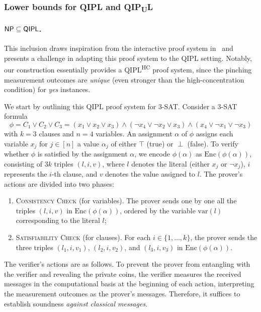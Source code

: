 \documentclass[10pt,a4paper]{article}
\numberwithin{equation}{section}
\numberwithin{figure}{section}
\newcommand{\NP}{\textnormal{\textsf{NP}}\xspace}
\newcommand{\QIPL}{\textnormal{\textsf{QIPL}}\xspace}
\newcommand{\QIPUL}{\texorpdfstring{\textnormal{\textsf{QIP}\textsubscript{\textnormal{U}}\textsf{L}}}\xspace}
\newcommand{\QIPLHC}{\texorpdfstring{\textnormal{\textsf{QIPL}\textsuperscript{\textnormal{HC}}}}\xspace}
\newcommand{\threeSAT}{\textnormal{\textsc{3-SAT}}\xspace}
\newcommand{\var}{\mathrm{var}}
\newcommand{\Enc}{\mathrm{Enc}}
\begin{document}
\subsubsection{Lower bounds for \QIPL{} and \QIPUL{}}

\paragraph{$\NP{} \subseteq \QIPL{}$.}
This inclusion draws inspiration from the interactive proof system in~\cite[Lemma 2]{CL95} and presents a challenge in adapting this proof system to the \QIPL{} setting. 
Notably, our construction essentially provides a \QIPLHC{} proof system, since the pinching measurement outcomes are \textit{unique} (even stronger than the high-concentration condition) for \textit{yes} instances. 

We start by outlining this \QIPL{} proof system for \threeSAT{}. 
Consider a \threeSAT{} formula 
\[\phi = C_1 \vee C_2 \vee C_3 = (x_1 \vee x_2 \vee x_3) \wedge (\neg x_4 \vee \neg x_2 \vee x_3) \wedge (x_4 \vee \neg x_1 \vee \neg x_3)\]
with $k=3$ clauses and $n=4$ variables. An assignment $\alpha$ of $\phi$ assigns each variable $x_j$ for $j \in [n]$ a value $\alpha_j$ of either $\top$ (true) or $\perp$ (false). 
To verify whether $\phi$ is satisfied by the assignment $\alpha$, we encode $\phi(\alpha)$ as $\Enc(\phi(\alpha))$, consisting of $3k$ triples $(l,i,v)$, where $l$ denotes the literal (either $x_j$ or $\neg x_j$), $i$ represents the $i$-th clause, and $v$ denotes the value assigned to $l$. The prover's actions are divided into two phases: 
\begin{enumerate}[label={\upshape(\roman*)}, itemsep=0.33em, topsep=0.33em, parsep=0.33em]
    \item \textsc{Consistency Check} (for variables). The prover sends one by one all the triples $(l,i,v)$ in $\Enc(\phi(\alpha))$, ordered by the variable $\var(l)$ corresponding to the literal $l$; 
    \item \textsc{Satisfiability Check} (for clauses). For each $i\in\{1,\ldots,k\}$, the prover sends the three triples $(l_1,i,v_1)$, $(l_2,i,v_2)$, and $(l_3,i,v_3)$ in $\Enc(\phi(\alpha))$.
\end{enumerate}

The verifier's actions are as follows. 
To prevent the prover from entangling with the verifier and revealing the private coins, the verifier measures the received messages in the computational basis at the beginning of each action, interpreting the measurement outcomes as the prover's messages. Therefore, it suffices to establish soundness \textit{against classical messages}. 
\end{document}

